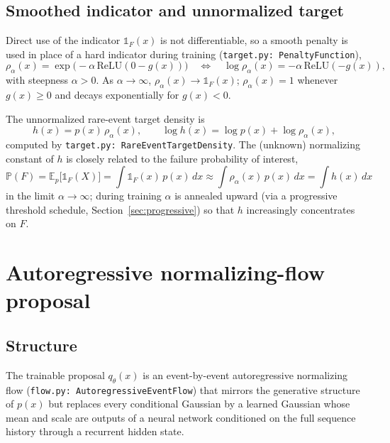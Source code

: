 \documentclass[11pt]{article}
\newcommand{\E}{\mathbb{E}}
\newcommand{\Prob}{\mathbb{P}}
\begin{document}
\subsection{Smoothed indicator and unnormalized target}

Direct use of the indicator $\mathbb 1_F(x)$ is not differentiable, so a
smooth penalty is used in place of a hard indicator during training
(\texttt{target.py: PenaltyFunction}),
\begin{equation}
\rho_\alpha(x) = \exp\big(-\alpha\,\mathrm{ReLU}(0 - g(x))\big)
\quad\Longleftrightarrow\quad
\log \rho_\alpha(x) = -\alpha\,\mathrm{ReLU}(-g(x)),
\label{eq:penalty}
\end{equation}
with steepness $\alpha > 0$. As $\alpha \to \infty$, $\rho_\alpha(x) \to
\mathbb 1_F(x)$; $\rho_\alpha(x) = 1$ whenever $g(x) \ge 0$ and decays
exponentially for $g(x) < 0$.

The unnormalized rare-event target density is
\begin{equation}
h(x) = p(x)\,\rho_\alpha(x),
\qquad
\log h(x) = \log p(x) + \log \rho_\alpha(x),
\label{eq:target}
\end{equation}
computed by \texttt{target.py: RareEventTargetDensity}. The (unknown)
normalizing constant of $h$ is closely related to the failure probability of
interest,
\begin{equation}
\Prob(F) = \E_{p}\big[\mathbb 1_F(X)\big] = \int \mathbb 1_F(x)\,p(x)\,dx
\approx \int \rho_\alpha(x)\,p(x)\,dx = \int h(x)\,dx
\end{equation}
in the limit $\alpha \to \infty$; during training $\alpha$ is annealed
upward (via a progressive threshold schedule, Section~\ref{sec:progressive})
so that $h$ increasingly concentrates on $F$.

\section{Autoregressive normalizing-flow proposal}

\subsection{Structure}

The trainable proposal $q_\theta(x)$ is an event-by-event autoregressive
normalizing flow (\texttt{flow.py: AutoregressiveEventFlow}) that mirrors the
generative structure of $p(x)$ but replaces every conditional Gaussian by a
learned Gaussian whose mean and scale are outputs of a neural network
conditioned on the full sequence history through a recurrent hidden state.
\end{document}
